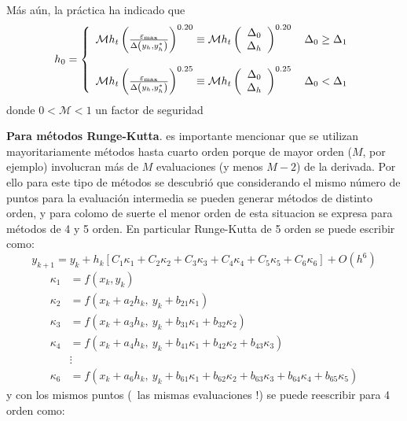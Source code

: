 \documentclass[spanish,titlepage,11pt]{article}
\begin{document}
M\'{a}s a\'{u}n, la pr\'{a}ctica ha indicado que
\[
h_{0}=\left\{
\begin{array}
[c]{c}%
\mathcal{M}h_{t}\left(  \frac{\varepsilon_{\max}}{\Delta\left(  y_{h}%
,y_{h}^{*}\right)  }\right)  ^{0.20}\equiv\mathcal{M}h_{t}\left(
\begin{array}
[c]{c}%
\Delta_{0}\\
\Delta_{h}%
\end{array}
\right)  ^{0.20}\quad\Delta_{0}\geq\Delta_{1}\\
\\
\mathcal{M}h_{t}\left(  \frac{\varepsilon_{\max}}{\Delta\left(  y_{h}%
,y_{h}^{*}\right)  }\right)  ^{0.25}\equiv\mathcal{M}h_{t}\left(
\begin{array}
[c]{c}%
\Delta_{0}\\
\Delta_{h}%
\end{array}
\right)  ^{0.25}\quad\Delta_{0}<\Delta_{1}%
\end{array}
\right.
\]
donde $0<\mathcal{M}<1$ un factor de seguridad

\textbf{Para m\'{e}todos Runge-Kutta}. es importante mencionar que se utilizan
mayoritariamente m\'{e}todos hasta cuarto orden porque de mayor orden ($M$,
por ejemplo) involucran m\'{a}s de $M$ evaluaciones (y menos $M-2$) de la
derivada. Por ello para este tipo de m\'{e}todos se descubri\'{o} que
considerando el mismo n\'{u}mero de puntos para la evaluaci\'{o}n intermedia
se pueden generar m\'{e}todos de distinto orden, y para colomo de suerte el
menor orden de esta situacion se expresa para m\'{e}todos de 4 y 5 orden. En
particular Runge-Kutta de 5 orden se puede escribir como:
\[
y_{k+1}=y_{k}+h_{k}\left[  C_{1}\kappa_{1}+C_{2}\kappa_{2}+C_{3}\kappa
_{3}+C_{4}\kappa_{4}+C_{5}\kappa_{5}+C_{6}\kappa_{6}\right]  +O(h^{6})
\]
\begin{align*}
\kappa_{1}  &  =f\left(  x_{k},y_{k}\right) \\
\kappa_{2}  &  =f\left(  x_{k}+a_{2}h_{k},\ y_{k}+b_{21}\kappa_{1}\right) \\
\kappa_{3}  &  =f\left(  x_{k}+a_{3}h_{k},\ y_{k}+b_{31}\kappa_{1}%
+b_{32}\kappa_{2}\right) \\
\kappa_{4}  &  =f\left(  x_{k}+a_{4}h_{k},\ y_{k}+b_{41}\kappa_{1}%
+b_{42}\kappa_{2}+b_{43}\kappa_{3}\right) \\
&  \vdots\\
\kappa_{6}  &  =f\left(  x_{k}+a_{6}h_{k},\ y_{k}+b_{61}\kappa_{1}%
+b_{62}\kappa_{2}+b_{63}\kappa_{3}+b_{64}\kappa_{4}+b_{65}\kappa_{5}\right)
\end{align*}
y con los mismos puntos (\textexclamdown\ las mismas evaluaciones !) se puede
reescribir para 4 orden como:%
\end{document}
